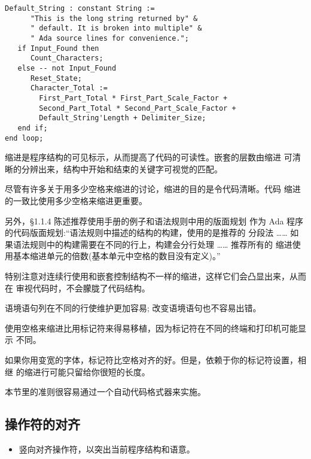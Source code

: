 \begin{blockindent}
\noindent
\begin{verbatim}
Default_String : constant String :=
      "This is the long string returned by" &
      " default. It is broken into multiple" &
      " Ada source lines for convenience.";
   if Input_Found then
      Count_Characters;
   else -- not Input_Found
      Reset_State;
      Character_Total :=
        First_Part_Total * First_Part_Scale_Factor +
        Second_Part_Total * Second_Part_Scale_Factor +
        Default_String'Length + Delimiter_Size;
   end if;
end loop;
\end{verbatim}
\end{blockindent}

\begin{blockindent}
缩进是程序结构的可见标示，从而提高了代码的可读性。嵌套的层数由缩进
可清晰的分辨出来，结构中开始和结束的关键字可视觉的匹配。

尽管有许多关于用多少空格来缩进的讨论，缩进的目的是令代码清晰。代码
缩进的一致比使用多少空格来缩进更重要。

另外，\cite{ARM95}\S{}1.1.4 陈述推荐使用手册的例子和语法规则中用的版面规划
作为 Ada 程序的代码版面规划:``语法规则中描述的结构的构建，使用的是推荐的
分段法 …… 如果语法规则中的构建需要在不同的行上，构建会分行处理 …… 推荐所有的
缩进使用基本缩进单元的倍数(基本单元中空格的数目没有定义)。''

特别注意对连续行使用和嵌套控制结构不一样的缩进，这样它们会凸显出来，从而在
审视代码时，不会朦胧了代码结构。

语境语句列在不同的行使维护更加容易; 改变语境语句也不容易出错。

使用空格来缩进比用标记符来得易移植，因为标记符在不同的终端和打印机可能显示
不同。
\end{blockindent}

\begin{blockindent}
如果你用变宽的字体，标记符比空格对齐的好。但是，依赖于你的标记符设置，相继
的缩进行可能只留给你很短的长度。
\end{blockindent}

\begin{blockindent}
本节里的准则很容易通过一个自动代码格式器来实施。
\end{blockindent}

\subsection{操作符的对齐}
\begin{itemize}
    \item 竖向对齐操作符，以突出当前程序结构和语意。
\end{itemize}

